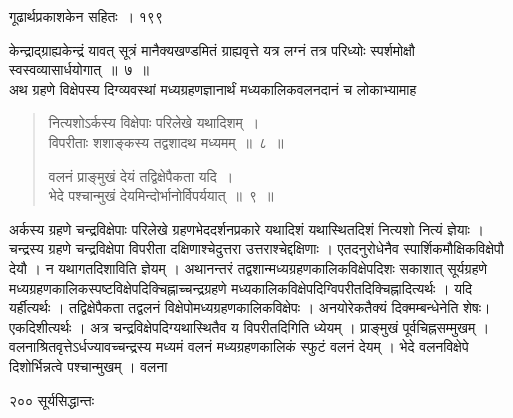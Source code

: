 \documentclass[11pt, openany]{book}
\begin{document}
\newpage

\hspace{3.5cm} गूढार्थप्रकाशकेन सहितः~। \hfill १९९ 
\vspace{1cm}


\noindent केन्द्राद्ग्राह्यकेन्द्रं यावत् सूत्रं मानैक्यखण्डमितं ग्राह्यवृत्ते यत्र लग्नं तत्र परिध्योः स्पर्शमोक्षौ स्वस्वव्यासार्धयोगात्~॥~७~॥\\
\noindent अथ ग्रहणे विक्षेपस्य दिग्व्यवस्थां मध्यग्रहणज्ञानार्थं मध्यकालिकवलनदानं च लोकाभ्यामाह\textendash


\begin{quote}
{\ssi नित्यशोऽर्कस्य विक्षेपाः परिलेखे यथादिशम्~।\\
 विपरीताः शशाङ्कस्य तद्वशादथ मध्यमम्~॥~८~॥

वलनं प्राङ्मुखं देयं तद्विक्षेपैकता यदि~।\\
भेदे पश्चान्मुखं देयमिन्दोर्भानोर्विपर्ययात्~॥~९~॥} 
\end{quote}


 अर्कस्य ग्रहणे चन्द्रविक्षेपाः परिलेखे ग्रहणभेददर्शनप्रकारे यथादिशं यथास्थितदिशं नित्यशो नित्यं ज्ञेयाः । चन्द्रस्य ग्रहणे चन्द्रविक्षेपा विपरीता दक्षिणाश्चेदुत्तरा उत्तराश्चेद्दक्षिणाः । एतदनुरोधेनैव स्पार्शिकमौक्षिकविक्षेपौ देयौ । न यथागतदिशाविति ज्ञेयम् । अथानन्तरं तद्वशान्मध्यग्रहणकालिकविक्षेपदिशः सकाशात् सूर्यग्रहणे मध्यग्रहणकालिकस्पष्टविक्षेपदिक्चिह्नाच्चन्द्रग्रहणे मध्यकालिकविक्षेपदिग्विपरीतदिक्चिह्नादित्यर्थः । यदि यर्हीत्यर्थः । तद्विक्षेपैकता तद्वलनं विक्षेपोमध्यग्रहणकालिकविक्षेपः । अनयोरेकतैक्यं दिक्मम्बन्धेनेति शेषः। एकदिशीत्यर्थः । अत्र चन्द्रविक्षेपदिग्यथास्थितैव य विपरीतदिगिति ध्येयम् । प्राङ्मुखं पूर्वचिह्नसम्मुखम् । वलनाश्रितवृत्तेऽर्धज्यावच्चन्द्रस्य मध्यमं वलनं मध्यग्रहणकालिकं स्फुटं वलनं देयम् । भेदे वलनविक्षेपे दिशोर्भिन्नत्वे पश्चान्मुखम् । वलना\textendash


\newpage

\noindent २०० \hspace{3.5cm} सूर्यसिद्धान्तः
\vspace{1cm}
\end{document}
